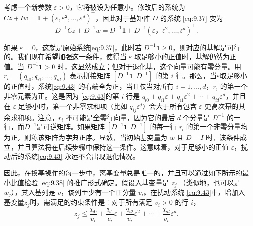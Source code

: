 考虑一个新参数 \(\varepsilon  > 0\)，它将被设为任意小。修改后的系统为 \({Cz} + {Iw} = \mathbf{1} + {\left( \varepsilon,{\varepsilon }^{2},\ldots,{\varepsilon }^{d}\right) }^{\top }\)，因此对于基矩阵 \(D\) 的系统 \eqref{eq:9.37} 变为
\begin{equation}
\label{eq:9.43}
{D}^{-1}{Cz} + {D}^{-1}w = {D}^{-1}\mathbf{1} + {D}^{-1}{\left( \varepsilon，{\varepsilon }^{2},\ldots,{\varepsilon }^{d}\right) }^{\top }.
\end{equation}

如果 \(\varepsilon  = 0\)，这就是原始系统\eqref{eq:9.37}，此时若 \({D}^{-1}\mathbf{1} \geq 0\)，则对应的基解是可行的。我们现在希望加强这一条件，使得当 \(\varepsilon\) 取足够小的正值时，基解仍然为正值。当 \({D}^{-1}\mathbf{1} > 0\) 时，这显然成立；但对于退化基，这个向量可能有零分量。用 \({r}_{i} = \left( {{q}_{i0},{q}_{i1},\ldots,{q}_{id}}\right)\) 表示拼接矩阵 \(\left\lbrack  {{D}^{-1}\mathbf{1}~~{D}^{-1}}\right\rbrack\) 的第 \(i\) 行。那么，当\(\varepsilon\)取足够小的正值时，系统\eqref{eq:9.43} 的右端全为正，当且仅当对所有 \(i = 1,\ldots,d\)，\({r}_{i}\) 的第一个非零元素为正。这是因为 \eqref{eq:9.43}的第 \(i\) 行是 \({q}_{i0} + {q}_{i1}\varepsilon  + {q}_{i1}{\varepsilon }^{2} + \cdots  + {q}_{id}{\varepsilon }^{d}\)，并且在 \(\varepsilon\) 足够小时，第一个非零求和项（比如 \({q}_{ij}{\varepsilon }^{j}\)）会大于所有包含 \(\varepsilon\) 更高次幂的其余求和项。注意，\({r}_{i}\) 不可能是全零行向量，因为它的最后 \(d\) 个分量是 \({D}^{-1}\) 的一行，而\({D}^{-1}\)是可逆矩阵。如果矩阵 
\(\left\lbrack  {{D}^{-1}\mathbf{1}~~{D}^{-1}}\right\rbrack\) 的每一行 \({r}_{i}\) 的第一个非零分量均为正，则称该矩阵为字典正序。显然，当初始基变量为 \(w\) 且 \(D = I\) 时，该条件成立，并且算法将在后续步骤中保持这一条件。这意味着，对于足够小的正值 \(\varepsilon\)，扰动后的系统\eqref{eq:9.43} 永远不会出现退化情况。


因此，在换基操作的每一步中，离基变量总是唯一的，并且可以通过如下所示的最小比值检验 \eqref{eq:9.38} 的推广形式确定。假设入基变量是 \({z}_{j}\) （类似地，也可以是 \({w}_{j}\)），其入基列是 \(v\)，该列至少有一个正分量 \({v}_{i}\)。在扰动系统 \eqref{eq:9.43}中，增加入基变量\({z}_{j}\)时，需满足的约束条件是：对于所有满足 \({v}_{i} > 0\) 的行 \(i\)，
\begin{equation}
\label{eq:9.44}
{z}_{j} \leq  \frac{{q}_{i0}}{{v}_{i}} + \frac{{q}_{i1}}{{v}_{i}}\varepsilon  + \frac{{q}_{i2}}{{v}_{i}}{\varepsilon }^{2} + \cdots  + \frac{{q}_{id}}{{v}_{i}}{\varepsilon }^{d}.
\end{equation}

